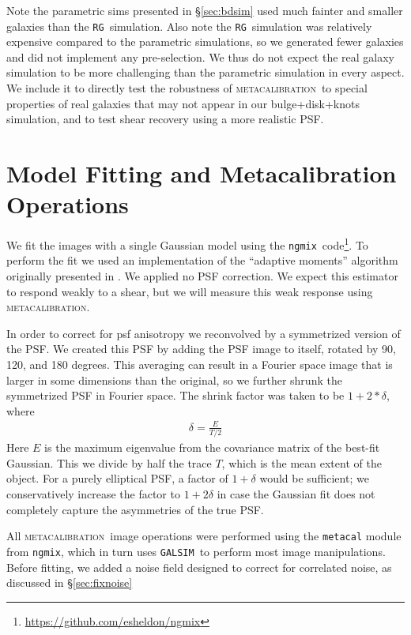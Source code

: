 \documentclass[iop]{emulateapj}
\newcommand{\mcal}{\textsc{metacalibration}}
\newcommand{\ngmix}{\texttt{ngmix}}
\newcommand{\rgsim}{\texttt{RG}}
\newcommand{\galsim}{\texttt{GALSIM}}
\begin{document}
Note the parametric sims presented in \S \ref{sec:bdsim} used much fainter and
smaller galaxies than the \rgsim\ simulation.  Also note the \rgsim\ simulation
was relatively expensive compared to the parametric simulations, so we
generated fewer galaxies and did not implement any pre-selection.  We thus do
not expect the real galaxy simulation to be more challenging than the
parametric simulation in every aspect. We include it to directly test the
robustness of \mcal\ to special properties of real galaxies that may not appear
in our bulge+disk+knots simulation, and to test shear recovery using a more
realistic PSF.  


\section{Model Fitting and Metacalibration Operations} \label{sec:modelfit}

We fit the images with a single Gaussian model using the \ngmix\
code\footnote{\url{https://github.com/esheldon/ngmix}}.  To perform the fit we used an
implementation of the ``adaptive moments'' algorithm originally presented in
\cite{bj02}.   We applied no PSF correction.  We expect this estimator to
respond weakly to a shear, but we will measure this weak response using \mcal.

In order to correct for psf anisotropy  we reconvolved by a symmetrized version
of the PSF. We created this PSF by adding the PSF image to itself, rotated by
90, 120, and 180 degrees.  This averaging can result in a Fourier space image
that is larger in some dimensions than the original, so we further shrunk
the symmetrized PSF in Fourier space.  The shrink factor was taken to be
$1+2*\delta$, where
\begin{align}
    \delta = \frac{E}{T/2}
\end{align}
Here $E$ is the maximum eigenvalue from the covariance matrix of the best-fit
Gaussian. This we divide by half the trace $T$, which is the mean extent of the
object.  For a purely elliptical PSF, a factor of $1+\delta$ would be
sufficient; we conservatively increase the factor to $1+2\delta$ in case the
Gaussian fit does not completely capture the asymmetries of the true PSF.

All \mcal\ image operations were performed using the \texttt{metacal} module
from \ngmix, which in turn uses \galsim\ to perform most image manipulations.
Before fitting, we added a noise field designed to correct for correlated
noise, as discussed in \S \ref{sec:fixnoise}
\end{document}
